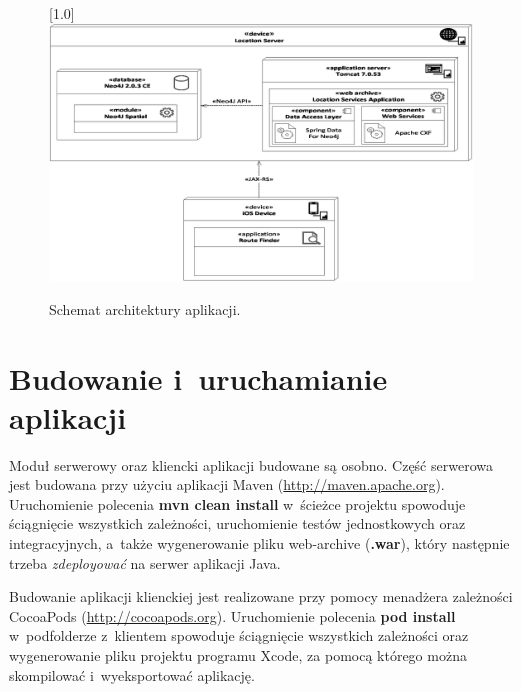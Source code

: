\documentclass[a4paper,12pt]{article}
\begin{document}
	\begin{figure}[ht!]
		\centering
		\scalebox{0.7}[1.0]{
			\includegraphics{graphics/architecture.eps}
		}

		\caption{Schemat architektury aplikacji.}
		\label{fig:architecture}
	\end{figure}

	\section*{Budowanie i~uruchamianie aplikacji}

	Moduł serwerowy oraz kliencki aplikacji budowane są osobno. Część serwerowa jest budowana przy użyciu aplikacji Maven (\url{http://maven.apache.org}). Uruchomienie polecenia \textbf{mvn clean install} w~ścieżce projektu spowoduje ściągnięcie wszystkich zależności, uruchomienie testów jednostkowych oraz integracyjnych, a~także wygenerowanie pliku web-archive (\textbf{.war}), który następnie trzeba \emph{zdeployować} na serwer aplikacji Java.

	Budowanie aplikacji klienckiej jest realizowane przy pomocy menadżera zależności CocoaPods (\url{http://cocoapods.org}). Uruchomienie polecenia \textbf{pod install} w~podfolderze z~klientem spowoduje ściągnięcie wszystkich zależności oraz wygenerowanie pliku projektu programu Xcode, za pomocą którego można skompilować i~wyeksportować aplikację.
\end{document}
